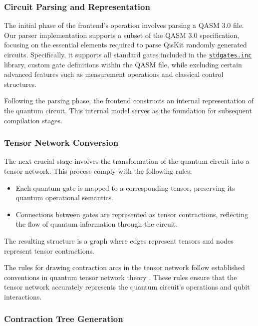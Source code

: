 \documentclass[12pt,oneside,a4paper]{article}
\begin{document}
\subsubsection{Circuit Parsing and Representation}

The initial phase of the frontend's operation involves parsing a QASM 3.0\cite{cross2017openquantumassemblylanguage} file. Our parser implementation supports a subset of the QASM 3.0 specification, focusing on the essential elements required to parse QisKit\cite{qiskit2024} randomly generated circuits. Specifically, it supports all standard gates included in the \href{https://github.com/Qiskit/qiskit/blob/main/qiskit/qasm/libs/stdgates.inc}{\texttt{stdgates.inc}} library, custom gate definitions within the QASM file, while excluding certain advanced features such as measurement operations and classical control structures.

Following the parsing phase, the frontend constructs an internal representation of the quantum circuit. This internal model serves as the foundation for subsequent compilation stages.

\subsubsection{Tensor Network Conversion}

The next crucial stage involves the transformation of the quantum circuit into a tensor network. This process comply with the following rules:

\begin{itemize}
    \item Each quantum gate is mapped to a corresponding tensor, preserving its quantum operational semantics.
    \item Connections between gates are represented as tensor contractions, reflecting the flow of quantum information through the circuit.
\end{itemize}

The resulting structure is a graph where edges represent tensors and nodes represent tensor contractions.

The rules for drawing contraction arcs in the tensor network follow established conventions in quantum tensor network theory \cite{biamonte2017tensornetworksnutshell}. These rules ensure that the tensor network accurately represents the quantum circuit's operations and qubit interactions.

\subsubsection{Contraction Tree Generation}
\end{document}
